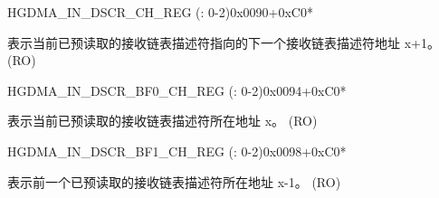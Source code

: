 \begin{register}{H}{GDMA\_IN\_DSCR\_CH\_REG (: 0-2)}{0x0090+0xC0*}\label{regdesc:GDMAINDSCRCHNREG}
%
\regnewline%
\begin{regdesc}\begin{reglist}
\label{fielddesc:GDMAINLINKDSCRCHN}\item [GDMA\_INLINK\_DSCR\_CH\regindex{n}] 表示当前已预读取的接收链表描述符指向的下一个接收链表描述符地址 x+1。 (RO)
\end{reglist}\end{regdesc}
\end{register}


\begin{register}{H}{GDMA\_IN\_DSCR\_BF0\_CH\_REG (: 0-2)}{0x0094+0xC0*}\label{regdesc:GDMAINDSCRBF0CHNREG}
%
\regnewline%
\begin{regdesc}\begin{reglist}
\label{fielddesc:GDMAINLINKDSCRBF0CHN}\item [GDMA\_INLINK\_DSCR\_BF0\_CH\regindex{n}] 表示当前已预读取的接收链表描述符所在地址 x。 (RO)
\end{reglist}\end{regdesc}
\end{register}


\begin{register}{H}{GDMA\_IN\_DSCR\_BF1\_CH\_REG (: 0-2)}{0x0098+0xC0*}\label{regdesc:GDMAINDSCRBF1CHNREG}
%
\regnewline%
\begin{regdesc}\begin{reglist}
\label{fielddesc:GDMAINLINKDSCRBF1CHN}\item [GDMA\_INLINK\_DSCR\_BF1\_CH\regindex{n}] 表示前一个已预读取的接收链表描述符所在地址 x-1。 (RO)
\end{reglist}\end{regdesc}
\end{register}


